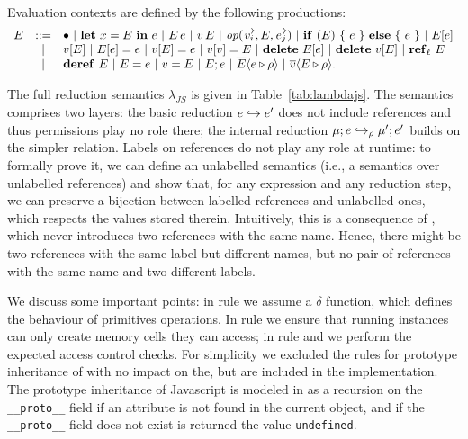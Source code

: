 Evaluation contexts are defined by the following productions:
$$
\begin{array}{lcl}
E & ::= & \bullet ~|~ \mathbf{let}\ x = E\ \mathbf{in}\ e ~|~ E\, e~|~v\, E ~|~ \mathit{op}(\overrightarrow{v_i},E,\overrightarrow{e_j}) ~|~ \mathbf{if}\ (E)\ \{\ e\ \}\ \mathbf{else}\ \{\ e\ \} ~|~ E[e] \\
& | & v[E] ~|~ E[e] = e ~|~ v[E] = e ~|~ v[v] = E ~|~ \mathbf{delete}\ E[e] ~|~ \mathbf{delete}\ v[E] ~|~ \mathbf{ref}_{\ell}\ E \\
& | &  \mathbf{deref}\ E ~|~ E = e ~|~ v = E ~|~ E;e ~|~ \overline{E} \langle e \triangleright \rho \rangle~|~\overline{v} \langle E \triangleright \rho \rangle.
\end{array}
$$

The full reduction semantics $\lambda_{JS}$ is given in
Table~\ref{tab:lambdajs}. The semantics comprises two layers: the
basic reduction $e \hookrightarrow e'$ does not include references and thus
permissions play no role there; the internal reduction $\mu;e \hookrightarrow_\rho
\mu';e'$ builds on the simpler relation. Labels on references do not
play any role at runtime: to formally prove it, we can define an
unlabelled semantics (i.e., a semantics over unlabelled references) and
show that, for any expression and any reduction step, we can preserve
a bijection between labelled references and unlabelled ones, which
respects the values stored therein. Intuitively, this is a consequence
of , which never introduces two references with the same
name. Hence, there might be two references with the same label but
different names, but no pair of references with the same name and two
different labels.

We discuss some important points: in rule  we assume a $\delta$ function, which defines the behaviour of primitives operations. In rule  we ensure that running instances can only create memory cells they can access; in rule  and  we perform the expected access control checks. For simplicity we excluded the rules for prototype inheritance of \ljs with no impact on the, but are included in the implementation. The prototype inheritance of Javascript is modeled in \ljs as a recursion on the \texttt{\_\_proto\_\_} field if an attribute is not found in the current object, and if the \texttt{\_\_proto\_\_} field does not exist is returned the value \texttt{undefined}.

